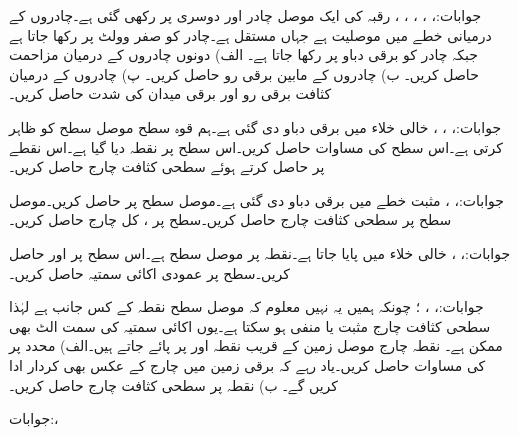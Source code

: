 جوابات:، ، ، ، ، 
رقبہ  کی ایک موصل چادر  اور دوسری  پر رکھی گئی ہے۔چادروں کے درمیانی خطے میں موصلیت  ہے جہاں  مستقل ہے۔چادر  کو صفر وولٹ پر رکھا جاتا ہے جبکہ چادر  کو  برقی دباو پر رکھا جاتا ہے۔ الف) دونوں چادروں کے درمیان مزاحمت حاصل کریں۔ ب) چادروں کے مابین برقی رو حاصل کریں۔ پ) چادروں کے درمیان کثافت برقی رو اور برقی میدان کی شدت حاصل کریں۔

جوابات:، ، ،
خالی خلاء میں برقی دباو  دی گئی ہے۔ہم قوہ سطح  موصل سطح کو ظاہر کرتی ہے۔اس سطح کی مساوات حاصل کریں۔اس سطح پر نقطہ  دیا گیا ہے۔اس نقطے پر  حاصل کرتے ہوئے سطحی کثافت چارج  حاصل کریں۔

جوابات:، ،
مثبت  خطے میں برقی دباو  دی گئی ہے۔موصل سطح  پر   حاصل کریں۔موصل سطح پر سطحی کثافت چارج حاصل کریں۔سطح پر ،  کل چارج حاصل کریں۔

جوابات:، ، 
خالی خلاء میں  پایا جاتا ہے۔نقطہ  پر موصل سطح ہے۔اس سطح پر  اور  حاصل کریں۔سطح پر عمودی اکائی سمتیہ  حاصل کریں۔

جوابات:، ،
 ؛ چونکہ ہمیں یہ نہیں معلوم کہ موصل سطح نقطہ   کے کس جانب ہے لہٰذا سطحی کثافت چارج مثبت یا منفی ہو سکتا ہے۔یوں اکائی سمتیہ کی سمت الٹ بھی ممکن ہے۔
نقطہ چارج  موصل زمین  کے قریب نقطہ  اور  پر پائے جاتے ہیں۔الف) محدد  پر  کی مساوات حاصل کریں۔یاد رہے کہ برقی زمین میں چارج کے عکس بھی کردار ادا کریں گے۔ ب) نقطہ  پر سطحی کثافت چارج حاصل کریں۔

جوابات:، 
